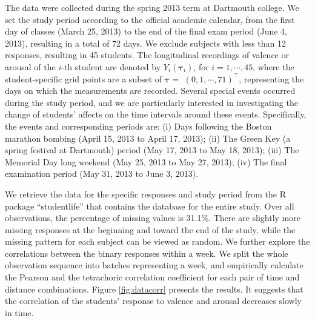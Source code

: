 
The data were collected during the spring 2013 term at Dartmouth college. We set the study 
period according to the official academic calendar, from the first day of classes (March 25, 2013) 
to the end of the final exam period (June 4, 2013), resulting in a total of 72 days. We exclude 
subjects with less than 12 responses, resulting in 45 students. The longitudinal recordings of 
valence or arousal of the $i$-th student are denoted by $Y_i(\boldsymbol{\tau}_i)$, for
$i=1,\cdots,45$, where the student-specific grid points are a subset of $\boldsymbol{\tau}=$
$(0,1,\cdots,71)^{\top}$, representing the days on which the measurements are recorded. 
Several special events occurred during the study period, and we are particularly interested 
in investigating the change of students' affects on the time intervals around these events. 
Specifically, the events and corresponding periods are: (i) Days following the Boston marathon 
bombing (April 15, 2013 to April 17, 2013); (ii) The Green Key (a spring festival at Dartmouth) 
period (May 17, 2013 to May 18, 2013); (iii) The Memorial Day long weekend (May 25, 2013 to 
May 27, 2013); (iv) The final examination period (May 31, 2013 to June 3, 2013).       


We retrieve the data for the specific responses and study period from the R package 
``studentlife'' that contains the database for the entire study. Over all observations, 
the percentage of missing values is 31.1\%. There are slightly more missing responses at 
the beginning and toward the end of the study, while the missing pattern for each subject 
can be viewed as random. We further explore the correlations between the binary responses 
within a week. We split the whole observation sequence into batches representing a week, 
and empirically calculate the Pearson and the tetrachoric correlation coefficient for each 
pair of time and distance combinations. Figure \ref{fig:datacorr} presents the results. 
It suggests that the correlation of the students' response to valence and arousal decreases 
slowly in time. 
%
%
%

